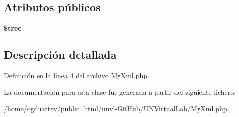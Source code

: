\subsection*{Atributos públicos}
\begin{DoxyCompactItemize}
\item 
\mbox{\label{classMyXml_a2f675194b628cef67cea0fecbc213be5}} 
{\bfseries \$tree}
\end{DoxyCompactItemize}


\subsection{Descripción detallada}


Definición en la línea 4 del archivo My\+Xml.\+php.



La documentación para esta clase fue generada a partir del siguiente fichero\+:\begin{DoxyCompactItemize}
\item 
/home/ogduartev/public\+\_\+html/unvl-\/\+Git\+Hub/\+U\+N\+Virtual\+Lab/My\+Xml.\+php\end{DoxyCompactItemize}
